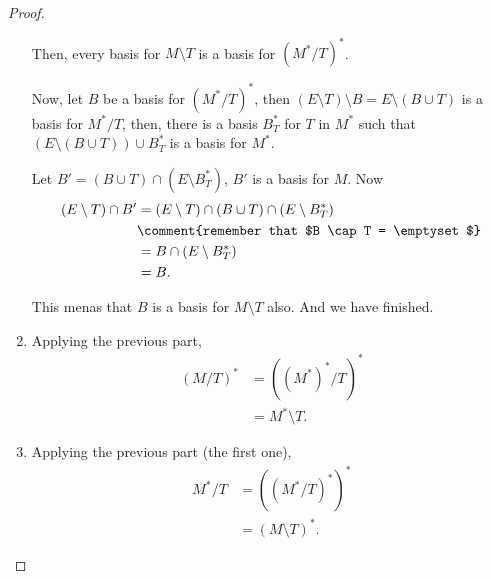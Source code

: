 \begin{proof}
\begin{enumerate}[label=(\roman*)]
            Then, every basis for $M \setminus T$ is a basis for $(M^* / T)^*$.\pn
            
            Now, let $B$ be a basis for $(M^* / T)^*$, then $(E \setminus T) \setminus B = E \setminus (B \cup T)$ 
            is a basis for $M^* / T$, then, there is a basis $B_T^*$ for $T$ in $M^*$ such that
            $(E \setminus (B \cup T)) \cup B_T^*$ is a basis for $M^*$.\pn
            
            Let $B' = (B \cup T) \cap (E \setminus B_T^*)$, $B'$ is a basis for $M$. Now
            \begin{align}
                    (E \setminus T) \cap B' &=  (E \setminus T) \cap (B \cup T) \cap (E \setminus B_T^*)        \\
                                            &\comment{remember that $B \cap T = \emptyset$}                   \\
                                            &=  B \cap (E \setminus B_T^*)                                      \\
                                            &=  B.
            \end{align}
            
            This menas that $B$ is a basis for $M \setminus T$ also. And we have finished.
        \item
            Applying the  previous part, 
                \begin{align}
                        (M / T)^*   &=  ((M^*)^* / T)^* \\
                                    &=  M^* \setminus T.
                \end{align}
        \item
            Applying the previous part (the first one),
                \begin{align}
                        M^* / T     &=  ((M^* / T)^*)^*         \\
                                    &=  (M \setminus T)^*.
                \end{align}
    \end{enumerate}
\end{proof}